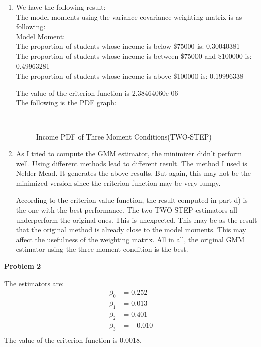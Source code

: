 \documentclass[letterpaper,12pt]{article}
\theoremstyle{definition}
\numberwithin{equation}{section}
\begin{document}
\begin{enumerate} [\bfseries (a)]
\item We have the following result:\\
The model moments using the variance covariance weighting matrix is as following:\\
Model Moment:\\
The proportion of students whose income is below \$75000 is: 0.30040381   \\
The proportion of students whose income is between \$75000 and \$100000 is:  0.49963281    \\
The proportion of students whose income is above \$100000 is: 0.19996338  \par
The value of the criterion function is 2.38464060e-06\\
The following is the PDF graph:\\
	\begin{figure}[H]
    		\centering
		\fbox{\resizebox{5in}{3in}{\texttt{[image: 1e]}}}\
    		\caption{Income PDF of Three Moment Conditions(TWO-STEP)}
	\end{figure}\par
\item
As I tried to compute the GMM estimator, the minimizer didn't perform well. Using different methods lead to different result. The method I used is Nelder-Mead. It generates the above results. But again, this may not be the minimized version since the criterion function may be very lumpy.\par
According to the criterion value function, the result computed in part d) is the one with the best performance. The two TWO-STEP estimators all underperform the original ones. This is unexpected. This may be as the result that the original method is already close to the model moments. This may affect the usefulness of the weighting matrix. All in all, the original GMM estimator using the three moment condition is the best.\par
\end{enumerate}

\noindent \textbf{\large Problem 2}\par
The estimators are:\\
\begin{align*}
\beta_0 &= 0.252\\
\beta_1 &= 0.013\\
\beta_2 &= 0.401\\
\beta_3 &= -0.010\\
\end{align*}
The value of the criterion function is \(0.0018\).
\end{document}
